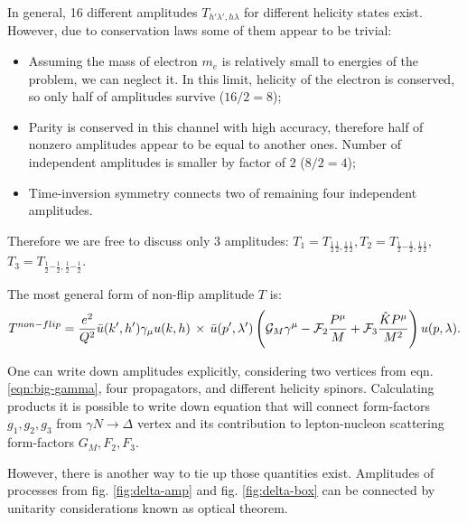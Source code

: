\documentclass[12pt]{revtex4-1}
\newcommand{\hp}{{\frac{1}{2}}}
\newcommand{\hm}{{-\frac{1}{2}}}
\newcommand{\cG}{{\cal G}}
\newcommand{\cF}{{\cal F}}
\begin{document}
	In general, 16 different amplitudes $T_{h'\lambda',h\lambda}$ 
	for different helicity states exist. However, due to conservation 
	laws some of them appear to be trivial:
	\begin{itemize}
		\item Assuming the mass of electron $m_e$ is relatively small 
			to energies of the problem, we can neglect it. In this 
			limit, helicity of the electron is conserved, so only half 
			of amplitudes survive ($16/2 = 8$);
		\item Parity is conserved in this channel with high accuracy, 
			therefore half of nonzero amplitudes appear to be equal 
			to another ones. Number of independent amplitudes is 
			smaller by factor of $2$ ($8/2 = 4$);
		\item Time-inversion symmetry connects two of remaining four 
			independent amplitudes.			
	\end{itemize}
	Therefore we are free to discuss only $3$ amplitudes: 
	$T_{1} = T_{\hp \hp, \hp \hp}, T_{2} = T_{\hp \hm, \hp \hp},$
	$T_{3} = T_{\hp \hm, \hp \hm}$.
	
	The most general form of non-flip amplitude $T$ is:
	\begin{equation} \label{eqn:str-amp} 
		T^{non-flip} = \frac{e^2}{Q^2} \bar{u}(k',h') \gamma_\mu u(k,h) 
		\, \times \, \bar{u}(p',\lambda') 
		\left(\cG_M  \gamma^\mu - \cF_2 
		\frac{P^{\mu}}{M} + \cF_3  \frac{\hat{K} P^{\mu}}{M^2} 
		\right) u(p,\lambda).
	\end{equation}
	
	One can write down amplitudes explicitly, considering two vertices
	from eqn. \ref{eqn:big-gamma}, four propagators, and different helicity
	spinors. Calculating products it is possible to write down equation
	that will connect form-factors $g_1, g_2, g_3$ from $\gamma N \to\Delta$ vertex
	and its contribution to lepton-nucleon scattering form-factors $G_M, F_2, F_3$.
	
	However, there is another way to tie up those quantities exist.
	Amplitudes of processes from fig. \ref{fig:delta-amp} and
	fig. \ref{fig:delta-box} can be connected by unitarity considerations
	known as optical theorem.
	
\end{document}
